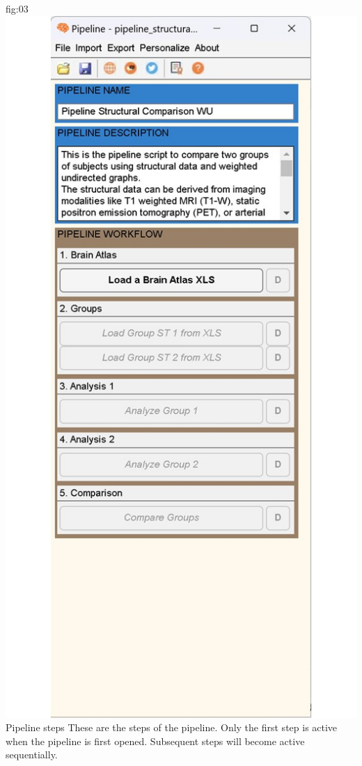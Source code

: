 \documentclass[justified]{tufte-handout}
\begin{document}
	{fig:03}
	{\includegraphics{fig03.jpg}}
	{Pipeline steps}
	{
	These are the steps of the pipeline. Only the first step is active when the pipeline is first opened. Subsequent steps will become active sequentially.
	}
\end{document}
